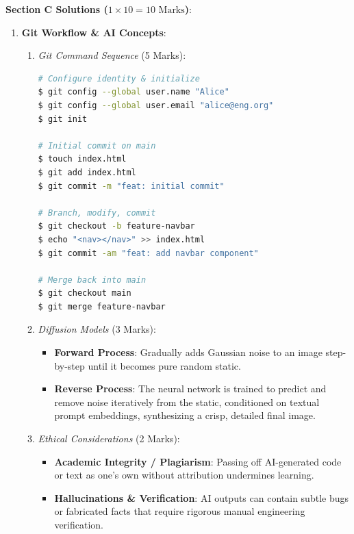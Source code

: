 \begin{solutionbox}
\medskip
\noindent\textbf{Section C Solutions ($1 \times 10 = 10\text{ Marks}$)}:
\begin{enumerate}[start=8]
    \item \textbf{Git Workflow \& AI Concepts}:
    \begin{enumerate}[label=(\alph*)]
        \item \textit{Git Command Sequence} (5 Marks):
        \begin{lstlisting}[language=bash]
# Configure identity & initialize
$ git config --global user.name "Alice"
$ git config --global user.email "alice@eng.org"
$ git init

# Initial commit on main
$ touch index.html
$ git add index.html
$ git commit -m "feat: initial commit"

# Branch, modify, commit
$ git checkout -b feature-navbar
$ echo "<nav></nav>" >> index.html
$ git commit -am "feat: add navbar component"

# Merge back into main
$ git checkout main
$ git merge feature-navbar
        \end{lstlisting}

        \item \textit{Diffusion Models} (3 Marks):
        \begin{itemize}
            \item \textbf{Forward Process}: Gradually adds Gaussian noise to an image step-by-step until it becomes pure random static.
            \item \textbf{Reverse Process}: The neural network is trained to predict and remove noise iteratively from the static, conditioned on textual prompt embeddings, synthesizing a crisp, detailed final image.
        \end{itemize}

        \item \textit{Ethical Considerations} (2 Marks):
        \begin{itemize}
            \item \textbf{Academic Integrity / Plagiarism}: Passing off AI-generated code or text as one's own without attribution undermines learning.
            \item \textbf{Hallucinations \& Verification}: AI outputs can contain subtle bugs or fabricated facts that require rigorous manual engineering verification.
        \end{itemize}
    \end{enumerate}
\end{enumerate}
\end{solutionbox}
